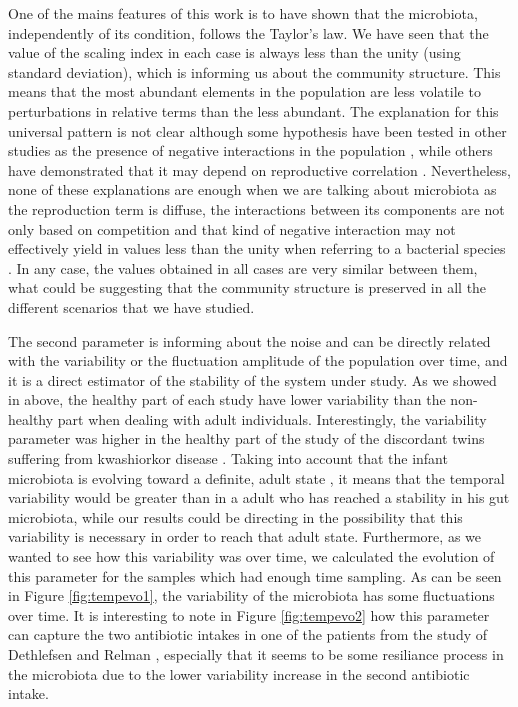 One of the mains features of this work is to have shown that the microbiota, independently of its condition, follows the Taylor's law. We have seen that the value of the scaling index in each case is always less than the unity (using standard deviation), which is informing us about the community structure. This means that the most abundant elements in the population are less volatile to perturbations in relative terms than the less abundant. The explanation for this universal pattern is not clear although some hypothesis have been tested in other studies as the presence of negative interactions in the population \cite{kilpatrick}, while others have demonstrated that it may depend on reproductive correlation \cite{ballantyne}. Nevertheless, none of these explanations are enough when we are talking about microbiota as the reproduction term is diffuse, the interactions between its components are not only based on competition \cite{joao, mehta, bucci} and that kind of negative interaction may not effectively yield in values less than the unity when referring to a bacterial species \cite{ramslayer}. In any case, the values obtained in all cases are very similar between them, what could be suggesting that the community structure is preserved in all the different scenarios that we have studied.

The second parameter is informing about the noise and can be directly related with the variability or the fluctuation amplitude of the population over time, and it is a direct estimator of the stability of the system under study. As we showed in above, the healthy part of each study have lower variability than the non-healthy part when dealing with adult individuals. Interestingly, the variability parameter was higher in the healthy part of the study of the discordant twins suffering from kwashiorkor disease \cite{kwashiorkor}. Taking into account that the infant microbiota is evolving toward a definite, adult state \cite{koenig}, it means that the temporal variability would be greater than in a adult who has reached a stability in his gut microbiota, while our results could be directing in the possibility that this variability is necessary in order to reach that adult state. Furthermore, as we wanted to see how this variability was over time, we calculated the evolution of this parameter for the samples which had enough time sampling. As can be seen in Figure \ref{fig:tempevo1}, the variability of the microbiota has some fluctuations over time. It is interesting to note in Figure \ref{fig:tempevo2} how this parameter can capture the two antibiotic intakes in one of the patients from the study of Dethlefsen and Relman \cite{antibiotic}, especially that it seems to be some resiliance process in the microbiota due to the lower variability increase in the second antibiotic intake.  

